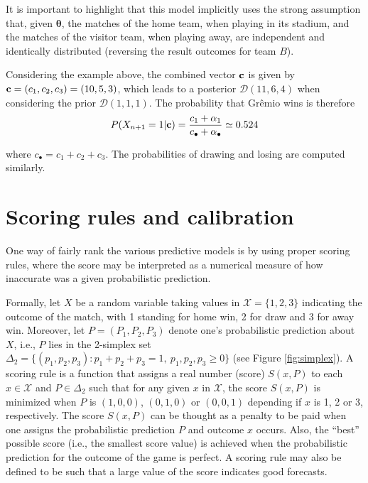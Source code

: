 \documentclass[journal,article,accept,moreauthors,pdftex,12pt,a4paper]{mdpi}
\begin{document}
    It is important to highlight that this model implicitly uses the strong assumption that, given $\boldsymbol{\theta}$, the matches of the home team, when playing in its stadium, and the matches of the visitor team, when playing away, are independent and identically distributed (reversing the result outcomes for team $B$).

    Considering the example above, the combined vector ${\bf c}$ is given by ${\bf c}=(c_1,c_2,c_3)=(10,5,3)$, which leads to a posterior $\mathcal{D}(11,6,4)$ when considering the prior $\mathcal{D}(1,1,1)$.
    The probability that Gr\^emio wins is therefore
    \[P(X_{n+1}=1|{\bf c})=\frac{c_1+\alpha_1}{c_{\bullet}+\alpha_{\bullet}}\simeq0.524
    \]

    \noindent
    where $c_{\bullet}=c_1+c_2+c_3$. The probabilities of drawing and losing are computed similarly.

    \section{Scoring rules and calibration}
    \label{sec::scoring}

    One way of fairly rank the various predictive models is by using proper scoring rules, where
    the score may be interpreted as a numerical measure of how inaccurate was a given probabilistic prediction.

    Formally, let $X$ be a random variable
    taking values in $\mathcal{X}=\{1,2,3\}$ indicating
    the outcome of the match, with 1 standing for home win, 2 for draw and 3 for away win.  Moreover, let $P=(P_1,P_2,P_3)$ denote one's probabilistic prediction
    about $X$, i.e., $P$ lies in the 2-simplex set $\Delta_2=\{(p_1,p_2,p_3):p_1+p_2+p_3=1, \ p_1,p_2,p_3\geq0\}$ (see Figure
    \ref{fig:simplex}).
    A scoring rule is a function
    that assigns a real number (score) $S(x,P)$ to each $x \in \mathcal{X}$
    and $P \in \Delta_2$
    such that
    for any given $x$ in $\mathcal{X}$, the score  $S(x,P)$ is minimized when $P$ is
    $(1,0,0)$, $(0,1,0)$ or $(0,0,1)$ depending if $x$ is 1, 2 or 3, respectively.
    The score $S(x,P)$ can be thought as
    a penalty to be paid when one assigns the
    probabilistic prediction $P$ and outcome
    $x$ occurs. Also, the ``best'' possible score (i.e., the smallest score value) is achieved when the probabilistic prediction for the outcome of the game is perfect. A scoring rule may also be defined to be such that a large value of the score indicates good forecasts.
        
\end{document}
